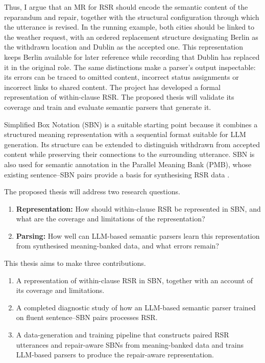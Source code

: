 \documentclass{article}
\begin{document}
Thus, I argue that an MR for RSR should encode the semantic content of the
reparandum and repair, together with the structural configuration through which the
utterance is revised. In the running example, both cities should be linked to the weather
request, with an ordered replacement structure designating Berlin as the
withdrawn location and Dublin as the accepted one. This representation keeps
Berlin available for later reference while recording that Dublin has replaced
it in the original role. The same distinctions make a parser's output
inspectable: its errors can be traced to omitted content, incorrect status
assignments or incorrect links to shared content. The project has developed a
formal representation of within-clause RSR. The proposed thesis will validate
its coverage and train and evaluate semantic parsers that generate it.

Simplified Box Notation (SBN)
\citep{bosQuantificationAnnotationDiscourse2021,bosSequenceNotationCatching2023}
is a suitable starting point because it combines a structured meaning
representation with a sequential format suitable for LLM generation. Its
structure can be extended to distinguish withdrawn from accepted content while
preserving their connections to the surrounding utterance. SBN is also used
for semantic annotation in the Parallel Meaning Bank (PMB), whose existing
sentence--SBN pairs provide a basis for synthesising RSR data
\citep{abzianidzeParallelMeaningBank2017}.


The proposed thesis will address two research questions.

\begin{enumerate}
  \item \textbf{Representation:} How should within-clause RSR
        be represented in SBN, and what are the coverage and
        limitations of the representation?
  \item \textbf{Parsing:} How well can LLM-based semantic parsers learn this
        representation from synthesised meaning-banked data, and what errors
        remain?
\end{enumerate}

This thesis aims to make three contributions.

\begin{enumerate}[itemsep=0.2em]
  \item A representation of within-clause RSR in SBN,
        together with an account of its coverage and limitations.
  \item A completed diagnostic study of how an LLM-based semantic parser
        trained on fluent sentence--SBN pairs processes RSR.
  \item A data-generation and training pipeline that constructs paired RSR
        utterances and repair-aware SBNs from meaning-banked data and trains
        LLM-based parsers to produce the repair-aware representation.
\end{enumerate}
\end{document}
